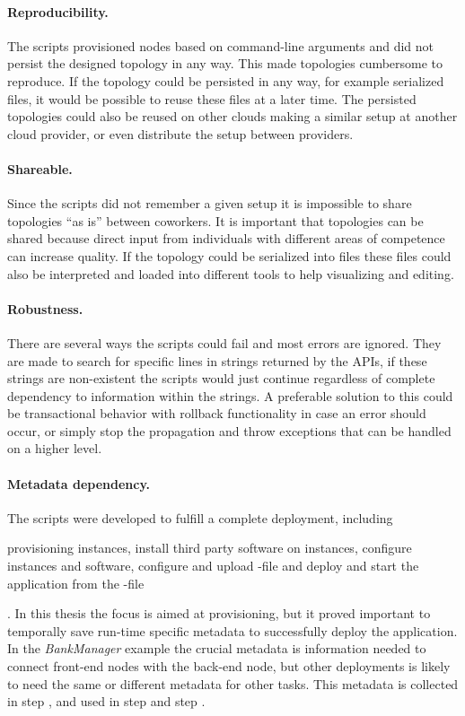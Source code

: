 \paragraph{Reproducibility.}

The scripts provisioned nodes based on command-line arguments
and did not persist the designed topology in any way.
This made topologies cumbersome to reproduce.
If the topology could be persisted in any way, for example serialized files,
it would be possible to reuse these files at a later time.
The persisted topologies could also be reused on other clouds making a 
similar setup at another cloud provider, or even distribute the setup
between providers.

\paragraph{Shareable.}

Since the scripts did not remember a given setup it is impossible 
to share topologies ``as is'' between coworkers.
It is important that topologies can be shared because direct input from individuals
with different areas of competence can increase quality.
If the topology could be serialized into files these files could also be interpreted
and loaded into different tools to help visualizing and editing.

\paragraph{Robustness.}

There are several ways the scripts could fail and most errors are ignored.
They are made to search for specific lines in strings returned by the APIs,
if these strings are non-existent the scripts would just continue regardless
of complete dependency to information within the strings.
A preferable solution to this could be transactional behavior with rollback functionality
in case an error should occur, or simply stop the propagation
and throw exceptions that can be handled on a higher level.

\paragraph{Metadata dependency.}

The scripts were developed to fulfill a complete deployment,
including 
\begin{ii}
  \iitem provisioning instances, 
  \iitem install third party software on instances,
  \iitem configure instances and software,
  \iitem configure and upload -file and
  \iitem deploy and start the application from the -file
\end{ii}.
In this thesis the focus is aimed at provisioning, but it proved important to temporally 
save run-time specific metadata to successfully deploy the application.
In the \emph{BankManager} example the crucial metadata is information needed to connect 
front-end nodes with the back-end node, but other deployments is likely to need the same 
or different metadata for other tasks.
This metadata is collected in step , and used in step  and step .

